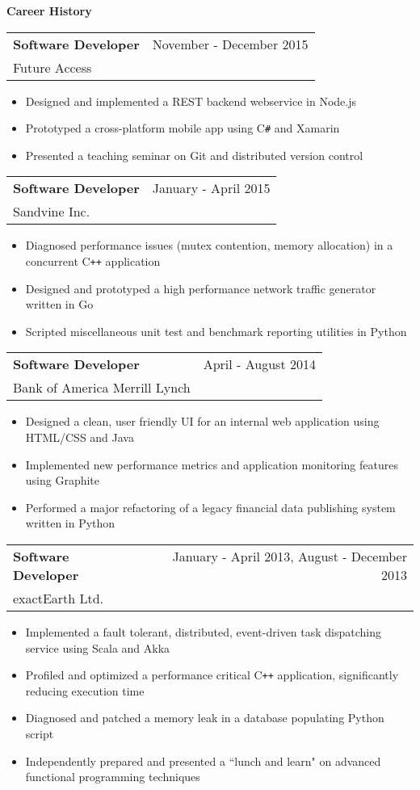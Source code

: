 \documentclass[10pt]{article}
\makeatletter
\newcommand{\resheading}[1]{{\large \colorbox{headercol}{\begin{minipage}{\textwidth}{\textbf{#1 \vphantom{p\^{E}}}}\end{minipage}}}}
\newcommand{\ressubheading}[3]{\item
\begin{tabular*}{7in}{l@{\extracolsep{\fill}}r}
    \textbf{#1} & #2 \\ #3
\end{tabular*}\vspace{-4pt}}
\makeatother
\begin{document}
\resheading{Career History}
\begin{description}
    \ressubheading{Software Developer} {November - December 2015} {Future Access}
    \begin{itemize}
        \item{Designed and implemented a REST backend webservice in Node.js}
        \item{Prototyped a cross-platform mobile app using C\texttt{\#} and Xamarin}
        \item{Presented a teaching seminar on Git and distributed version control}
    \end{itemize}

    \ressubheading{Software Developer} {January - April 2015} {Sandvine Inc.}
    \begin{itemize}
        \item{Diagnosed performance issues (mutex contention, memory allocation) in a concurrent C\texttt{++} application}
        \item{Designed and prototyped a high performance network traffic generator written in Go}
        \item{Scripted miscellaneous unit test and benchmark reporting utilities in Python}
    \end{itemize}

    \ressubheading{Software Developer} {April - August 2014} {Bank of America Merrill Lynch}
    \begin{itemize}
        \item{Designed a clean, user friendly UI for an internal web application using HTML/CSS and Java}
        \item{Implemented new performance metrics and application monitoring features using Graphite}
        \item{Performed a major refactoring of a legacy financial data publishing system written in Python}
    \end{itemize}

    \ressubheading{Software Developer} {January - April 2013, August - December 2013} {exactEarth Ltd.}
    \begin{itemize}
        \item{Implemented a fault tolerant, distributed, event-driven task dispatching service using Scala and Akka}
        \item{Profiled and optimized a performance critical C\texttt{++} application, significantly reducing execution time}
        \item{Diagnosed and patched a memory leak in a database populating Python script}
        \item{Independently prepared and presented a ``lunch and learn" on advanced functional programming techniques}
    \end{itemize}


\end{description}
\end{document}
